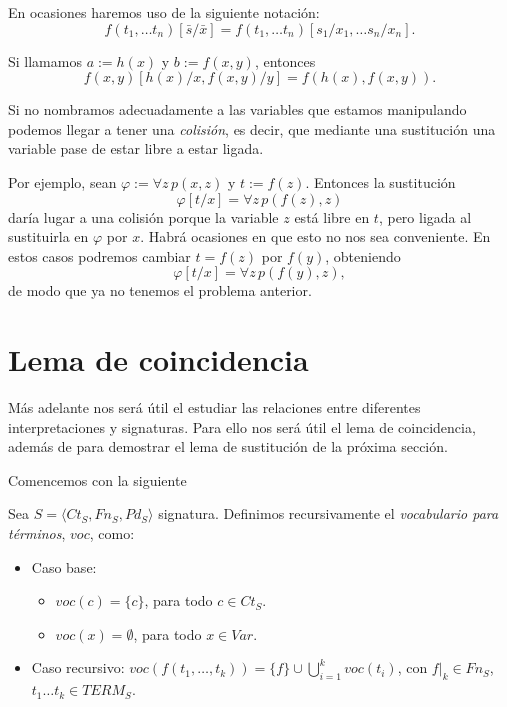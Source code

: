 En ocasiones haremos uso de la siguiente notación:
$$f(t_1, \dots t_n)[\bar{s}/\bar{x}] = f(t_1, \dots t_n)[s_1/x_1, \dots s_n/x_n].$$


\begin{example}
Si llamamos $a:= h(x)$ y $b:= f(x, y)$, entonces $$f(x, y)[h(x)/x, f(x, y)/y] = f(h(x), f(x, y)).$$
\end{example}


\begin{note}

Si no nombramos adecuadamente a las variables que estamos manipulando podemos llegar a tener una \textit{colisión}, es decir, que mediante una sustitución una variable pase de estar libre a estar ligada. 
 
Por ejemplo, sean $\varphi := \forall z \, p(x, z)$ y $t := f(z)$. Entonces la sustitución 
$$\varphi[t/x] = \forall z \, p(f(z), z)$$ 
daría lugar a una colisión porque la variable $z$ está libre en $t$, pero ligada al sustituirla en $\varphi$ por $x$. Habrá ocasiones en que esto no nos sea conveniente. En estos casos podremos cambiar $t=f(z)$ por $f(y)$, obteniendo
$$\varphi[t/x] = \forall z \, p(f(y), z),$$
de modo que ya no tenemos el problema anterior.
\end{note}


\section{Lema de coincidencia}

Más adelante nos será útil el estudiar las relaciones entre diferentes interpretaciones y signaturas. Para ello nos será útil el lema de coincidencia, además de para demostrar el lema de sustitución de la próxima sección.

Comencemos con la siguiente

\begin{definition}
Sea $S = \langle Ct_{S}, Fn_{S}, Pd_{S}\rangle$ signatura. Definimos recursivamente el \textit{vocabulario para términos}, $voc$, como:
\begin{itemize}
    \item Caso base: 
        \begin{itemize}
            \item $voc(c) = \{c\}$, para todo $c \in Ct_S$.
            \item $voc(x) = \emptyset$, para todo $x \in Var$.
        \end{itemize}
    \item Caso recursivo: $voc(f(t_1, \dots, t_k)) = \{ f\} \cup \bigcup \limits_{i = 1}^{k} voc(t_i)$, con $f|_k \in Fn_S$, $t_1 \dots t_k \in TERM_S$.
\end{itemize}
\end{definition}

